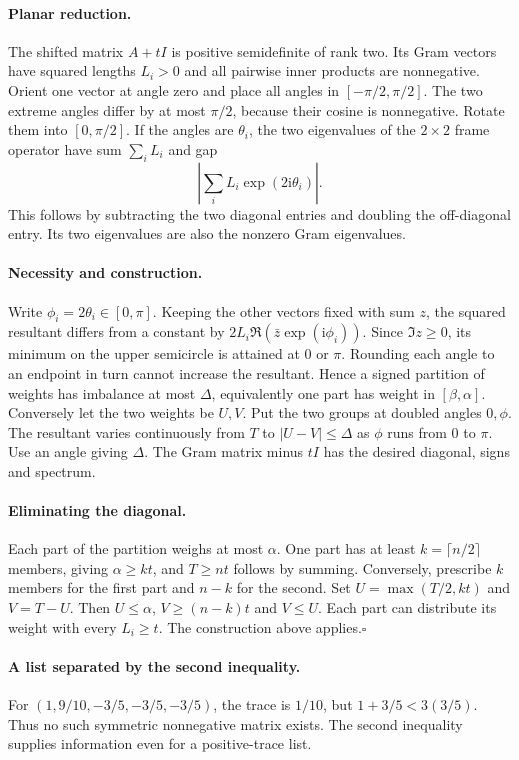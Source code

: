 \documentclass[11pt,a4paper]{article}
\begin{document}
\paragraph{Planar reduction.} The shifted matrix $A+tI$ is positive semidefinite of rank two. Its Gram vectors have squared lengths $L_i>0$ and all pairwise inner products are nonnegative. Orient one vector at angle zero and place all angles in $[-\pi/2,\pi/2]$. The two extreme angles differ by at most $\pi/2$, because their cosine is nonnegative. Rotate them into $[0,\pi/2]$. If the angles are $\theta_i$, the two eigenvalues of the $2\times2$ frame operator have sum $\sum_iL_i$ and gap
\[
        \left|\sum_i L_i\exp(2\mathrm i\theta_i)\right|.
\]
This follows by subtracting the two diagonal entries and doubling the off-diagonal entry. Its two eigenvalues are also the nonzero Gram eigenvalues.
\paragraph{Necessity and construction.} Write $\phi_i=2\theta_i\in[0,\pi]$. Keeping the other vectors fixed with sum $z$, the squared resultant differs from a constant by $2L_i\Re(\bar z\exp(\mathrm i\phi_i))$. Since $\Im z\ge0$, its minimum on the upper semicircle is attained at $0$ or $\pi$. Rounding each angle to an endpoint in turn cannot increase the resultant. Hence a signed partition of weights has imbalance at most $\Delta$, equivalently one part has weight in $[\beta,\alpha]$. Conversely let the two weights be $U,V$. Put the two groups at doubled angles $0,\phi$. The resultant varies continuously from $T$ to $|U-V|\le\Delta$ as $\phi$ runs from $0$ to $\pi$. Use an angle giving $\Delta$. The Gram matrix minus $tI$ has the desired diagonal, signs and spectrum.
\paragraph{Eliminating the diagonal.} Each part of the partition weighs at most $\alpha$. One part has at least $k=\lceil n/2\rceil$ members, giving $\alpha\ge kt$, and $T\ge nt$ follows by summing. Conversely, prescribe $k$ members for the first part and $n-k$ for the second. Set $U=\max(T/2,kt)$ and $V=T-U$. Then $U\le\alpha$, $V\ge(n-k)t$ and $V\le U$. Each part can distribute its weight with every $L_i\ge t$. The construction above applies.\hfill$\square$
\paragraph{A list separated by the second inequality.} For $(1,9/10,-3/5,-3/5,-3/5)$, the trace is $1/10$, but $1+3/5<3(3/5)$. Thus no such symmetric nonnegative matrix exists. The second inequality supplies information even for a positive-trace list.
\end{document}
